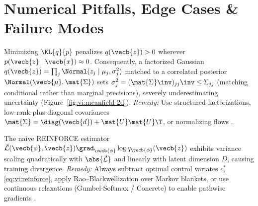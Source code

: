 \documentclass[../../../../master.tex]{subfiles}
\begin{document}

\section{Numerical Pitfalls, Edge Cases \& Failure Modes}

\begin{pitfall}
Minimizing $\KL{q}{p}$ penalizes $q(\vecb{z}) > 0$ wherever $p(\vecb{z}\mid\vecb{x}) \approx 0$. Consequently, a factorized Gaussian $q(\vecb{z}) = \prod_j \Normal(z_j \mid \mu_j, \sigma_j^2)$ matched to a correlated posterior $\Normal(\vecb{\mu}, \mat{\Sigma})$ sets $\sigma_j^2 = (\mat{\Sigma}\inv)_{jj}\inv \le \Sigma_{jj}$ (matching conditional rather than marginal precisions), severely underestimating uncertainty (Figure~\ref{fig:vi:meanfield-2d}). \emph{Remedy:} Use structured factorizations, low-rank-plus-diagonal covariances $\mat{\Sigma} = \diag(\vecb{d}) + \mat{U}\mat{U}\T$, or normalizing flows .
\end{pitfall}

\begin{pitfall}
The naive REINFORCE estimator $\tilde{\mathcal{L}}(\vecb{\phi}, \vecb{z})\grad_{\vecb{\phi}} \log q_{\vecb{\phi}}(\vecb{z})$ exhibits variance scaling quadratically with $\abs{\tilde{\mathcal{L}}}$ and linearly with latent dimension $D$, causing training divergence. \emph{Remedy:} Always subtract optimal control variates $c_i^*$ \eqref{eq:vi:reinforce}, apply Rao--Blackwellization over Markov blankets, or use continuous relaxations (Gumbel-Softmax / Concrete) to enable pathwise gradients .
\end{pitfall}
\end{document}
